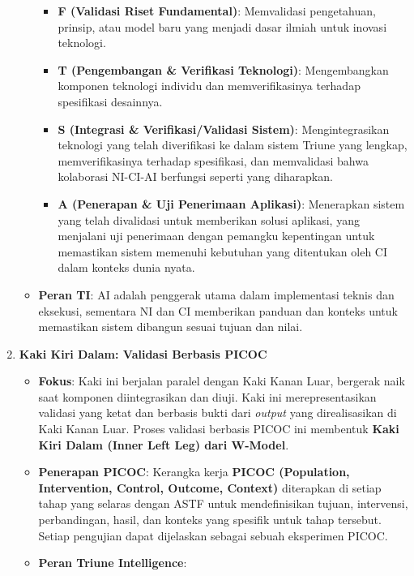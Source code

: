 \documentclass[
  letterpaper,
  DIV=11,
  numbers=noendperiod]{scrreprt}
\providecommand{\tightlist}{%
  \setlength{\itemsep}{0pt}\setlength{\parskip}{0pt}}
\begin{document}
\begin{enumerate}
\begin{itemize}
    \begin{itemize}
    \tightlist
    \item
      \textbf{F (Validasi Riset Fundamental)}: Memvalidasi pengetahuan,
      prinsip, atau model baru yang menjadi dasar ilmiah untuk inovasi
      teknologi.
    \item
      \textbf{T (Pengembangan \& Verifikasi Teknologi)}: Mengembangkan
      komponen teknologi individu dan memverifikasinya terhadap
      spesifikasi desainnya.
    \item
      \textbf{S (Integrasi \& Verifikasi/Validasi Sistem)}:
      Mengintegrasikan teknologi yang telah diverifikasi ke dalam sistem
      Triune yang lengkap, memverifikasinya terhadap spesifikasi, dan
      memvalidasi bahwa kolaborasi NI-CI-AI berfungsi seperti yang
      diharapkan.
    \item
      \textbf{A (Penerapan \& Uji Penerimaan Aplikasi)}: Menerapkan
      sistem yang telah divalidasi untuk memberikan solusi aplikasi,
      yang menjalani uji penerimaan dengan pemangku kepentingan untuk
      memastikan sistem memenuhi kebutuhan yang ditentukan oleh CI dalam
      konteks dunia nyata.
    \end{itemize}
  \item
    \textbf{Peran TI}: AI adalah penggerak utama dalam implementasi
    teknis dan eksekusi, sementara NI dan CI memberikan panduan dan
    konteks untuk memastikan sistem dibangun sesuai tujuan dan nilai.
  \end{itemize}
\item
  \textbf{Kaki Kiri Dalam: Validasi Berbasis PICOC}

  \begin{itemize}
  \tightlist
  \item
    \textbf{Fokus}: Kaki ini berjalan paralel dengan Kaki Kanan Luar,
    bergerak naik saat komponen diintegrasikan dan diuji. Kaki ini
    merepresentasikan validasi yang ketat dan berbasis bukti dari
    \emph{output} yang direalisasikan di Kaki Kanan Luar. Proses
    validasi berbasis PICOC ini membentuk \textbf{Kaki Kiri Dalam (Inner
    Left Leg) dari W-Model}.
  \item
    \textbf{Penerapan PICOC}: Kerangka kerja \textbf{PICOC (Population,
    Intervention, Control, Outcome, Context)} diterapkan di setiap tahap
    yang selaras dengan ASTF untuk mendefinisikan tujuan, intervensi,
    perbandingan, hasil, dan konteks yang spesifik untuk tahap tersebut.
    Setiap pengujian dapat dijelaskan sebagai sebuah eksperimen PICOC.
  \item
    \textbf{Peran Triune Intelligence}:


\end{itemize}
\end{enumerate}
\end{document}
